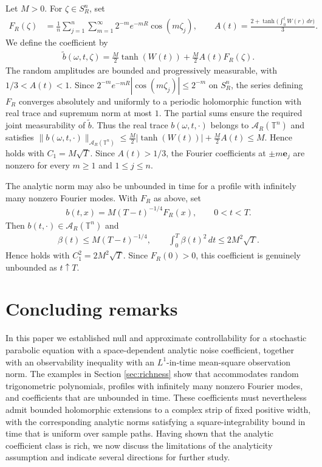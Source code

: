 \documentclass[print,wide]{draft}
\begin{document}
\begin{example}
Let $M>0$. For $\zeta\in S_R^n$, set
\begin{align*}
F_R(\zeta)
&=\frac1n\sum_{j=1}^n\sum_{m=1}^{\infty}
2^{-m}e^{-mR}\cos(m\zeta_j),
\qquad
A(t)=\frac{2+\tanh\bigl(\int_0^tW(r)\,dr\bigr)}3.
\end{align*}
We define the coefficient by
\begin{align*}
\widetilde b(\omega,t,\zeta)
=\frac M2\tanh(W(t))+\frac M2 A(t)F_R(\zeta).
\end{align*}
The random amplitudes are bounded and progressively measurable, with $1/3<A(t)<1$.
Since $2^{-m}e^{-mR}|\cos(m\zeta_j)|\le 2^{-m}$ on $S_R^n$, the series defining $F_R$ converges absolutely and uniformly to a periodic holomorphic function with real trace and supremum norm at most $1$.
The partial sums ensure the required joint measurability of $\widetilde b$.
Thus the real trace $b(\omega,t,\cdot)$ belongs to $\mathcal A_R(\mathbb T^n)$ and satisfies
$
\|b(\omega,t,\cdot)\|_{\mathcal A_R(\mathbb T^n)}
\le\frac M2|\tanh(W(t))|+\frac M2 A(t)\le M$.
Hence  holds with $C_1=M\sqrt T$.
Since $A(t)>1/3$, the Fourier coefficients at $\pm m\mathbf e_j$ are nonzero for every $m\ge1$ and $1\le j\le n$.
\end{example}

The analytic norm may also be unbounded in time for a profile with
infinitely many nonzero Fourier modes. With $F_R$ as above, set
\begin{align*}
b(t,x)=M(T-t)^{-1/4}F_R(x),
\qquad 0<t<T.
\end{align*}
Then $b(t,\cdot)\in\mathcal A_R(\mathbb T^n)$ and
\begin{align*}
\beta(t)\le M(T-t)^{-1/4},
\qquad
\int_0^T\beta(t)^2\,dt\le2M^2\sqrt T.
\end{align*}
Hence  holds with
$C_1^2=2M^2\sqrt T$. Since $F_R(0)>0$, this coefficient is genuinely
unbounded as $t\uparrow T$.


\section{Concluding remarks}



In this paper we established null and approximate controllability for a stochastic parabolic equation with a space-dependent analytic noise coefficient, together with an observability inequality with an \(L^1\)-in-time mean-square observation norm. The examples in Section \ref{sec:richness} show that  accommodates random trigonometric polynomials, profiles with infinitely many nonzero Fourier modes, and coefficients that are unbounded in time. These coefficients must nevertheless admit bounded holomorphic extensions to a complex strip of fixed positive width, with the corresponding analytic norms satisfying a square-integrability bound in time that is uniform over sample paths. Having shown that the analytic coefficient class is rich, we now discuss the limitations of the analyticity assumption and indicate several directions for further study.
\end{document}
